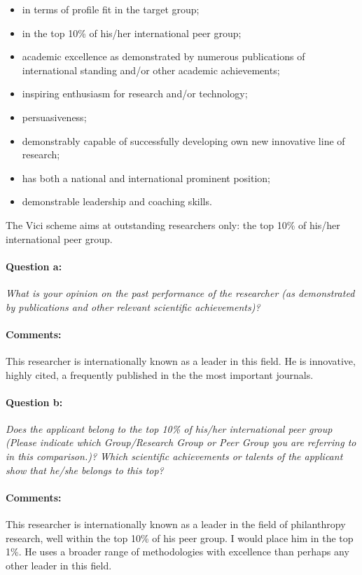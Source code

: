 \documentclass[twocolumn, serif, rga, numeric]{jote-article}
\begin{document}
\begin{itemize}
    \item in terms of profile fit in the target group;
 \item in the top 10\% of his/her international peer group;
 \item academic excellence as demonstrated by numerous publications of international standing and/or other academic achievements;
 \item inspiring enthusiasm for research and/or technology;
 \item persuasiveness;
 \item demonstrably capable of successfully developing own new innovative line of research;
 \item has both a national and international prominent position;
 \item demonstrable leadership and coaching skills.
    \end{itemize}

 The Vici scheme aims at outstanding researchers only: the top 10\% of his/her international peer group.
\paragraph{Question a:}
\textit{What is your opinion on the past performance of the researcher (as demonstrated by publications and other relevant scientific achievements)?}
\paragraph{Comments:}
This researcher is internationally known as a leader in this field. He is innovative, highly cited, a frequently published in the the most important journals.
\paragraph{Question b:}
\textit{Does the applicant belong to the top 10\% of his/her international peer group (Please indicate which Group/Research Group or Peer Group you are referring to in this comparison.)? Which scientific achievements or talents of the applicant show that he/she belongs to this top?}
\paragraph{Comments:}
This researcher is internationally known as a leader in the field of philanthropy research, well within the top 10\% of his peer group. I would place him in the top 1\%. He uses a broader range of methodologies with excellence than perhaps any other leader in this field.
\end{document}

